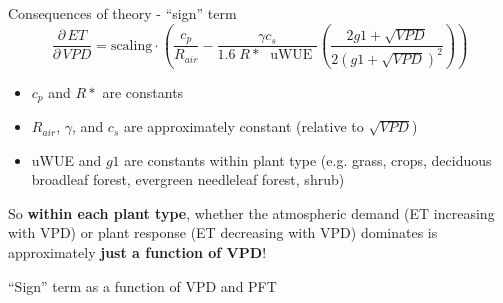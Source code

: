 \documentclass[aspectratio=169]{beamer}
\begin{document}
\begin{frame}{Consequences of theory - ``sign'' term}
  \[\frac{\partial \, ET}{\partial \, VPD} = \text{scaling} \cdot \left(\frac{ c_p}{R_{air}} - \frac{\gamma c_s }{1.6 \; R*\; \text{ uWUE }} \left( \frac{2 g1 + \sqrt{VPD}}{2 (g1 + \sqrt{VPD})^2}\right) \right)\]
  \begin{itemize}
  \item $c_p$ and $R*$ are constants
  \item $R_{air}$, $\gamma$, and $c_s$ are approximately constant (relative to $\sqrt{VPD}$)
  \item uWUE and $g1$ are constants within plant type (e.g. grass, crops, deciduous broadleaf forest, evergreen needleleaf forest, shrub)
  \end{itemize}
  So \textbf{within each plant type}, whether the atmospheric demand (ET increasing with VPD) or plant response (ET decreasing with VPD) dominates is approximately \textbf{just a function of VPD}!
\end{frame}


\begin{frame}{``Sign'' term as a function of VPD and PFT}
  \begin{figure}
  \end{figure}
\end{frame}
\end{document}
